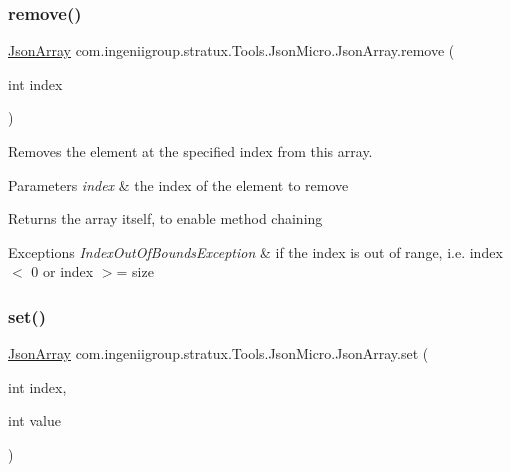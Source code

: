 \subsubsection{\texorpdfstring{remove()}{remove()}}
{\footnotesize\ttfamily \hyperlink{classcom_1_1ingeniigroup_1_1stratux_1_1_tools_1_1_json_micro_1_1_json_array}{Json\+Array} com.\+ingeniigroup.\+stratux.\+Tools.\+Json\+Micro.\+Json\+Array.\+remove (\begin{DoxyParamCaption}\item[{int}]{index }\end{DoxyParamCaption})}

Removes the element at the specified index from this array.


\begin{DoxyParams}{Parameters}
{\em index} & the index of the element to remove \\
\hline
\end{DoxyParams}
\begin{DoxyReturn}{Returns}
the array itself, to enable method chaining 
\end{DoxyReturn}

\begin{DoxyExceptions}{Exceptions}
{\em Index\+Out\+Of\+Bounds\+Exception} & if the index is out of range, i.\+e. {\ttfamily index $<$ 0} or {\ttfamily index $>$= size} \\
\hline
\end{DoxyExceptions}
\mbox{\label{classcom_1_1ingeniigroup_1_1stratux_1_1_tools_1_1_json_micro_1_1_json_array_a2cfe5b7fc8514b8b39b6c999d3a13b2b}} 
\subsubsection{\texorpdfstring{set()}{set()}\hspace{0.1cm}{\footnotesize\ttfamily [1/7]}}
{\footnotesize\ttfamily \hyperlink{classcom_1_1ingeniigroup_1_1stratux_1_1_tools_1_1_json_micro_1_1_json_array}{Json\+Array} com.\+ingeniigroup.\+stratux.\+Tools.\+Json\+Micro.\+Json\+Array.\+set (\begin{DoxyParamCaption}\item[{int}]{index,  }\item[{int}]{value }\end{DoxyParamCaption})}

